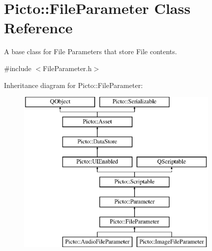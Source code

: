 \hypertarget{class_picto_1_1_file_parameter}{\section{Picto\-:\-:File\-Parameter Class Reference}
\label{class_picto_1_1_file_parameter}
}


A base class for File Parameters that store File contents.  




{\ttfamily \#include $<$File\-Parameter.\-h$>$}

Inheritance diagram for Picto\-:\-:File\-Parameter\-:\begin{figure}[H]
\begin{center}
\leavevmode
\includegraphics[height=8.000000cm]{class_picto_1_1_file_parameter}
\end{center}
\end{figure}
